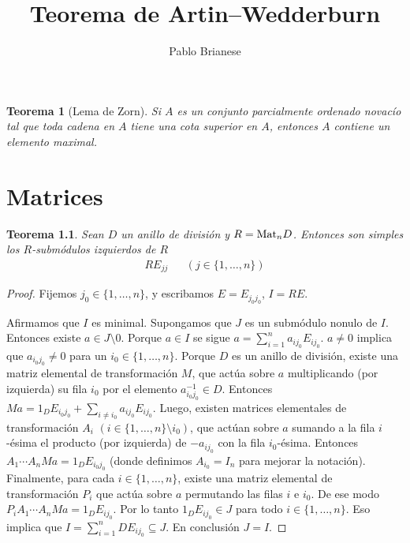 \documentclass{report}
\title{Teorema de Artin--Wedderburn}
\author{Pablo Brianese}
\newcommand{\Mat}{\textnormal{Mat}}
\newtheorem{theorem}{Teorema}
\begin{document}
  \maketitle

  \begin{theorem}[Lema de Zorn]
    Si \(A\) es un conjunto parcialmente ordenado novacío tal que toda cadena en \(A\) tiene una cota superior en \(A\), entonces \(A\) contiene un elemento maximal.
  \end{theorem}

  \chapter{Matrices}

  \begin{theorem}
    Sean \(D\) un anillo de división y \(R = \Mat_n D\).
    Entonces son simples los \(R\)-submódulos izquierdos de \(R\)
    \begin{align}
      R E_{j j}
      &&(j \in \{1, \dots, n\})
    \end{align}
  \end{theorem}
  \begin{proof}
    Fijemos \(j_0 \in \{1, \dots, n\}\), y escribamos \(E = E_{j_0 j_0}\), \(I = R E\).

    Afirmamos que \(I\) es minimal.
    Supongamos que \(J\) es un submódulo nonulo de \(I\).
    Entonces existe \(a \in J \setminus 0\).
    Porque \(a \in I\) se sigue \(a = \sum_{i = 1}^n a_{i j_0} E_{i j_0}\).
    \(a \neq 0\) implica que \(a_{i_0 j_0} \neq 0\) para un \(i_0 \in \{1, \dots, n\}\).
    Porque \(D\) es un anillo de división, existe una matriz elemental de transformación \(M\), que actúa sobre \(a\) multiplicando (por izquierda) su fila \(i_0\) por el elemento \(a_{i_0 j_0}^{- 1} \in D\).
    Entonces \(M a = 1_D E_{i_0 j_0} + \sum_{i \neq i_0} a_{i j_0} E_{i j_0}\).
    Luego, existen matrices elementales de transformación \(A_i\) \((i \in \{1, \dots, n\} \setminus i_0)\), que actúan sobre \(a\) sumando a la fila \(i\)-ésima el producto (por izquierda) de \(- a_{i j_0}\) con la fila \(i_0\)-ésima.
    Entonces \(A_1 \cdots A_n M a = 1_D E_{i_0 j_0}\) (donde definimos \(A_{i_0} = I_n\) para mejorar la notación).
    Finalmente, para cada \(i \in \{1, \dots, n\}\), existe una matriz elemental de transformación \(P_i\) que actúa sobre \(a\) permutando las filas \(i\) e \(i_0\).
    De ese modo \(P_i A_1 \cdots A_n M a = 1_D E_{i j_0}\).
    Por lo tanto \(1_D E_{i j_0} \in J\) para todo \(i \in \{1, \dots, n\}\).
    Eso implica que \(I = \sum_{i = 1}^n D E_{i j_0} \subseteq J\).
    En conclusión \(J = I\).
  \end{proof}
\end{document}
